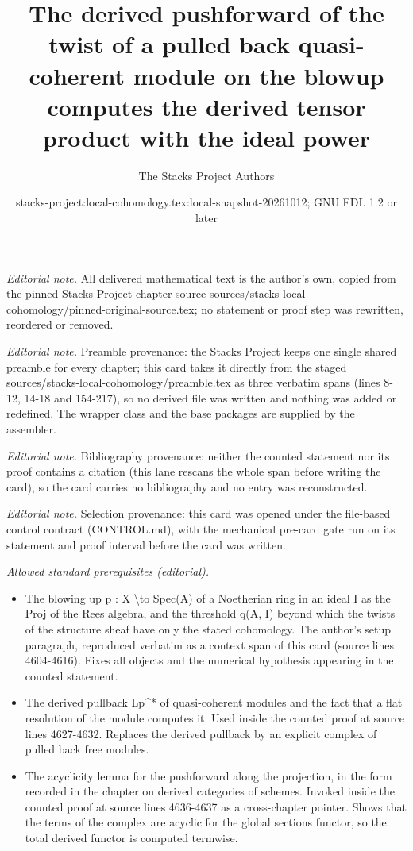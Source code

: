 \documentclass[10pt,a4paper]{amsart}
\title{The derived pushforward of the twist of a pulled back quasi-coherent module on the blowup computes the derived tensor product with the ideal power}
\author{The Stacks Project Authors}
\date{stacks-project:local-cohomology.tex:local-snapshot-20261012; GNU FDL 1.2 or later}
\theoremstyle{plain}
\theoremstyle{definition}
\theoremstyle{remark}
\numberwithin{equation}{subsection}
\begin{document}
\maketitle
\noindent\textit{Editorial note.} All delivered mathematical text is the author's own, copied from the pinned Stacks Project chapter source sources/stacks-local-cohomology/pinned-original-source.tex; no statement or proof step was rewritten, reordered or removed.\par\medskip
\noindent\textit{Editorial note.} Preamble provenance: the Stacks Project keeps one single shared preamble for every chapter; this card takes it directly from the staged sources/stacks-local-cohomology/preamble.tex as three verbatim spans (lines 8-12, 14-18 and 154-217), so no derived file was written and nothing was added or redefined. The wrapper class and the base packages are supplied by the assembler.\par\medskip
\noindent\textit{Editorial note.} Bibliography provenance: neither the counted statement nor its proof contains a citation (this lane rescans the whole span before writing the card), so the card carries no bibliography and no entry was reconstructed.\par\medskip
\noindent\textit{Editorial note.} Selection provenance: this card was opened under the file-based control contract (CONTROL.md), with the mechanical pre-card gate run on its statement and proof interval before the card was written.\par\medskip
\noindent\textit{Allowed standard prerequisites (editorial).}\begin{itemize}
\item The blowing up p : X \textbackslash{}to Spec(A) of a Noetherian ring in an ideal I as the Proj of the Rees algebra, and the threshold q(A, I) beyond which the twists of the structure sheaf have only the stated cohomology. The author's setup paragraph, reproduced verbatim as a context span of this card (source lines 4604-4616). Fixes all objects and the numerical hypothesis appearing in the counted statement.
\item The derived pullback Lp\textasciicircum{}* of quasi-coherent modules and the fact that a flat resolution of the module computes it. Used inside the counted proof at source lines 4627-4632. Replaces the derived pullback by an explicit complex of pulled back free modules.
\item The acyclicity lemma for the pushforward along the projection, in the form recorded in the chapter on derived categories of schemes. Invoked inside the counted proof at source lines 4636-4637 as a cross-chapter pointer. Shows that the terms of the complex are acyclic for the global sections functor, so the total derived functor is computed termwise.
\end{itemize}\medskip
\end{document}
